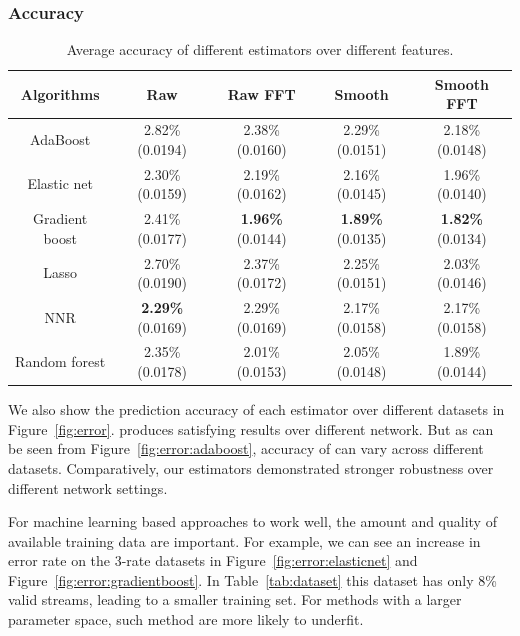 \subsubsection{Accuracy}
\label{ssub:accuracy}
\begin{table}[htpb]
   \centering
   \caption{Average accuracy of different estimators over different features.}
   \label{tab:accuracy}
   \begin{tabular}{|c|c|c|c|c|}
      \hline
      Algorithms     & Raw                     & Raw FFT                 & Smooth                  & Smooth FFT \\ \hline
      AdaBoost       & 2.82\%(0.0194)          & 2.38\%(0.0160)          & 2.29\%(0.0151)          & 2.18\%(0.0148)\\
      Elastic net    & 2.30\%(0.0159)          & 2.19\%(0.0162)          & 2.16\%(0.0145)          & 1.96\%(0.0140)\\
      Gradient boost & 2.41\%(0.0177)          & \textbf{1.96\%}(0.0144) & \textbf{1.89\%}(0.0135) & \textbf{1.82\%}(0.0134)\\
      Lasso          & 2.70\%(0.0190)          & 2.37\%(0.0172)          & 2.25\%(0.0151)          & 2.03\%(0.0146)\\
      NNR            & \textbf{2.29\%}(0.0169) & 2.29\%(0.0169)          & 2.17\%(0.0158)          & 2.17\%(0.0158)\\
      Random forest  & 2.35\%(0.0178)          & 2.01\%(0.0153)          & 2.05\%(0.0148)          & 1.89\%(0.0144)\\
      \hline
   \end{tabular}
\end{table}

We also show the prediction accuracy of each estimator over different datasets
in Figure~\ref{fig:error}. \cite{Yin2014} produces satisfying results
over different network. But as can be seen from
Figure~\ref{fig:error:adaboost}, accuracy of \cite{Yin2014} can vary across
different datasets. Comparatively, our estimators demonstrated stronger
robustness over different network settings.

For machine learning based approaches to work well, the amount and quality of
available training data are important. For example, we can see an increase in
error rate on the 3-rate datasets in Figure~\ref{fig:error:elasticnet} and
Figure~\ref{fig:error:gradientboost}. In Table~\ref{tab:dataset} this dataset
has only 8\% valid streams, leading to a smaller training set. For methods with
a larger parameter space, such method are more likely to underfit.

